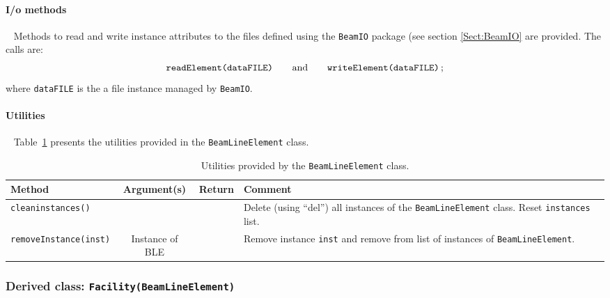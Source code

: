 \paragraph{I/o methods} ~\newline
\noindent
Methods to read and write instance attributes to the files defined
using the \texttt{BeamIO} package (see section \ref{Sect:BeamIO} are
provided.
The calls are:
\begin{equation}
  \texttt{readElement(dataFILE)} \quad \quad {\rm and }
      \quad \quad \texttt{writeElement(dataFILE)} \,; \nonumber
\end{equation}
where \texttt{dataFILE} is the a file instance managed by \texttt{BeamIO}.

\paragraph{Utilities} ~\newline
\noindent
Table~\ref{Tab:BLE:Utilities} presents the utilities provided in the
\texttt{BeamLineElement} class.
\begin{table}[h]
  \caption{
    Utilities provided by the \texttt{BeamLineElement}
    class. 
  }
  \label{Tab:BLE:Utilities}
  \begin{center}
    \begin{tabular}{|l|c|c|p{7cm}|}
      \hline
      \textbf{Method} & \textbf{Argument(s)} & \textbf{Return} & \textbf{Comment}                                            \\
      \hline
      \texttt{cleaninstances()}     &                 &  & Delete (using ``del'') all instances of the \texttt{BeamLineElement} class.
                                                           Reset \texttt{instances} list. \\
      \texttt{removeInstance(inst)} & Instance of BLE &  & Remove instance \texttt{inst} and remove from list of instances of
                                                           \texttt{BeamLineElement}. \\
      \hline
    \end{tabular}
  \end{center}
\end{table}

\FloatBarrier

\subsubsection{Derived class: \texttt{Facility(BeamLineElement)}}


